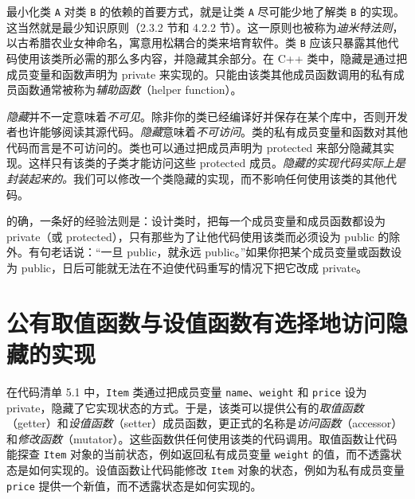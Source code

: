 最小化类 \texttt{A} 对类 \texttt{B} 的依赖的首要方式，就是让类 \texttt{A} 尽可能少地了解类 \texttt{B} 的实现。这当然就是最少知识原则（2.3.2 节和 4.2.2 节）。这一原则也被称为\emph{迪米特法则}，以古希腊农业女神命名，寓意用松耦合的类来培育软件。类 \texttt{B} 应该只暴露其他代码使用该类所必需的那么多内容，并隐藏其余部分。在 C++ 类中，隐藏是通过把成员变量和函数声明为 private 来实现的。只能由该类其他成员函数调用的私有成员函数通常被称为\emph{辅助函数}（helper function）。

\emph{隐藏}并不一定意味着\emph{不可见}。除非你的类已经编译好并保存在某个库中，否则开发者也许能够阅读其源代码。\emph{隐藏}意味着\emph{不可访问}。类的私有成员变量和函数对其他代码而言是不可访问的。类也可以通过把成员声明为 protected 来部分隐藏其实现。这样只有该类的子类才能访问这些 protected 成员。\emph{隐藏的实现代码实际上是封装起来的。}我们可以修改一个类隐藏的实现，而不影响任何使用该类的其他代码。


的确，一条好的经验法则是：设计类时，把每一个成员变量和成员函数都设为 private（或 protected），只有那些为了让他代码使用该类而必须设为 public 的除外。有句老话说：“一旦 public，就永远 public。”如果你把某个成员变量或函数设为 public，日后可能就无法在不迫使代码重写的情况下把它改成 private。

\section{公有取值函数与设值函数有选择地访问隐藏的实现}

在代码清单 5.1 中，\texttt{Item} 类通过把成员变量 \texttt{name}、\texttt{weight} 和 \texttt{price} 设为 private，隐藏了它实现状态的方式。于是，该类可以提供公有的\emph{取值函数}（getter）和\emph{设值函数}（setter）成员函数，更正式的名称是\emph{访问函数}（accessor）和\emph{修改函数}（mutator）。这些函数供任何使用该类的代码调用。取值函数让代码能探查 \texttt{Item} 对象的当前状态，例如返回私有成员变量 \texttt{weight} 的值，而不透露状态是如何实现的。设值函数让代码能修改 \texttt{Item} 对象的状态，例如为私有成员变量 \texttt{price} 提供一个新值，而不透露状态是如何实现的。

